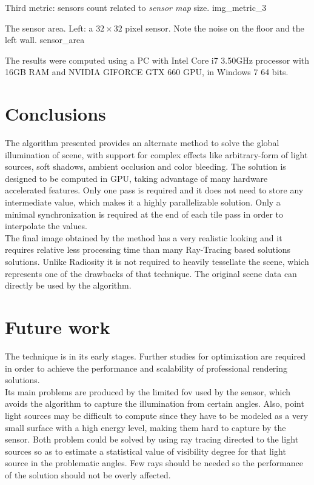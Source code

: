 \documentclass[10pt, conference]{IEEEtran}
\begin{document}
\subimages
	{Third metric: sensors count related to \emph{sensor map} size.}
	{img_metric_3}{
}


\subimages
	{The sensor area. Left: a $32 \times 32$ pixel sensor. Note the noise on the floor and the left wall.}
	{sensor_area}{
}

The results were computed using a PC with Intel Core i7 3.50GHz processor with 16GB RAM and NVIDIA GIFORCE GTX 660 GPU, in Windows 7 64 bits.


\section{Conclusions}
%
The algorithm presented provides an alternate method to solve the global illumination of scene, with support for complex effects like arbitrary-form of light sources, soft shadows, ambient occlusion and color bleeding. 
The solution is designed to be computed in GPU, taking advantage of many hardware accelerated features. 
Only one pass is required and it does not need to store any intermediate value, which makes it a highly parallelizable solution. 
Only a minimal synchronization is required at the end of each tile pass in order to interpolate the values.\\

The final image obtained by the method has a very realistic looking and it requires relative less processing time than many Ray-Tracing based solutions \cite{ray_tracing} solutions.
Unlike Radiosity it is not required to heavily tessellate the scene, which represents one of the drawbacks of that technique. 
The original scene data can directly be used by the algorithm.


\section{Future work}
%
The technique is in its early stages. Further studies for optimization are required in order to achieve the performance and scalability of professional rendering solutions.\\

Its main problems are produced by the limited fov used by the sensor, which avoids the algorithm to capture the illumination from certain angles.
Also, point light sources may be difficult to compute since they have to be modeled as a very small surface with a high energy level, making them hard to capture by the sensor.
Both problem could be solved by using ray tracing directed to the light sources so as to estimate a statistical value of visibility degree for that light source in the problematic angles. 
Few rays should be needed so the performance of the solution should not be overly affected.\\
\end{document}

